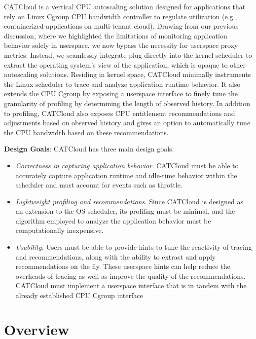CATCloud is a vertical CPU autoscaling solution designed for applications that rely on Linux Cgroup CPU bandwidth controller to regulate utilization (e.g., containerized applications on multi-tenant cloud). Drawing from our previous discussion, where we highlighted the limitations of monitoring application behavior solely in userspace, we now bypass the necessity for userspace proxy metrics. Instead, we seamlessly integrate plug directly into the kernel scheduler to extract the operating system's view of the application, which is opaque to other autoscaling solutions. Residing in kernel space, CATCloud minimally instruments the Linux scheduler to trace and analyze application runtime behavior. It also extends the CPU Cgroup by exposing a userspace interface to finely tune the granularity of profiling by determining the length of observed history. In addition to profiling, CATCloud also exposes CPU entitlement recommendations and adjustments based on observed history and gives an option to automatically tune the CPU bandwidth based on these recommendations.

\textbf{Design Goals}: CATCloud has three main design goals:
\begin{itemize}
    \item \textit{Correctness in capturing application behavior.} CATCloud must be able to accurately capture application runtime and idle-time behavior within the scheduler and must account for events such as throttle.
    \item \textit{Lightweight profiling and recommendations.} Since CATCloud is designed as an extension to the OS scheduler, its profiling must be minimal, and the algorithm employed to analyze the application behavior must be computationally inexpensive.
    \item \textit{Usability.} Users must be able to provide hints to tune the reactivity of tracing and recommendations, along with the ability to extract and apply recommendations on the fly. These userspace hints can help reduce the overheads of tracing as well as improve the quality of the recommendations. CATCloud must implement a userspace interface that is in tandem with the already established CPU Cgroup interface
\end{itemize}

\section{Overview}

